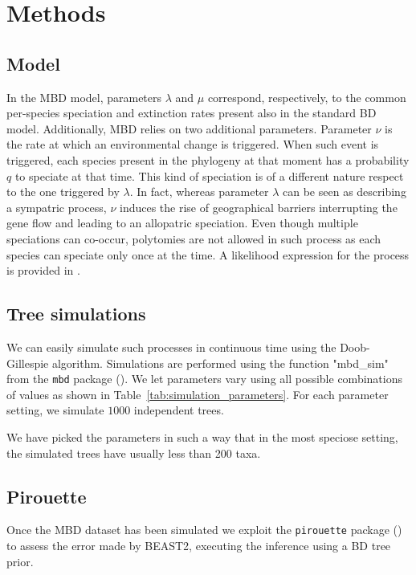 \section{Methods}

\subsection{Model}

In the MBD model, parameters $\lambda$ and $\mu$ correspond, respectively, 
to the common per-species speciation and extinction rates present 
also in the standard BD model. 
Additionally, MBD relies on two additional parameters. 
Parameter $\nu$ is the rate at which an environmental change is triggered.
When such event is triggered, each species present in the phylogeny at that 
moment has a probability $q$ to speciate at that time.
This kind of speciation is of a different nature respect to the one triggered 
by $\lambda$. In fact, whereas parameter $\lambda$ can be seen as describing 
a sympatric process, $\nu$ induces the rise of geographical barriers 
interrupting the gene flow and leading to an allopatric speciation.
Even though multiple speciations can co-occur, polytomies are not allowed 
in such process as each species can speciate only once at the time.
A likelihood expression for the process is provided in \cite{mbd}.

\subsection{Tree simulations}

We can easily simulate such processes in continuous time using the 
Doob-Gillespie algorithm. Simulations are performed using the 
function "mbd\_sim" from the \verb;mbd; package (\citep{mbd}).
We let parameters vary using all possible combinations of values
as shown in Table~\ref{tab:simulation_parameters}.
For each parameter setting, we simulate $1000$ independent trees.

We have picked the parameters in such a way that in the most speciose
setting, the simulated trees have usually less than 200 taxa.



\subsection{Pirouette}

Once the MBD dataset has been simulated we exploit the \verb;pirouette; 
package (\citep{pirouette}) to assess the error made by BEAST2, executing 
the inference using a BD tree prior.

